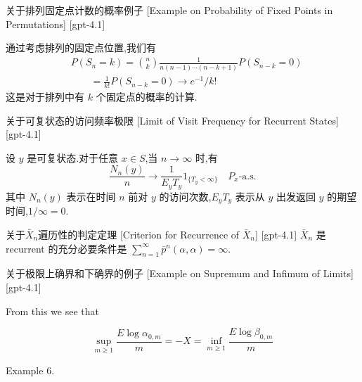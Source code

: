 \documentclass[UTF8]{ctexart}
\begin{document}
    
    
    \begin{xmp}
        {关于排列固定点计数的概率例子}
        [Example on Probability of Fixed Points in Permutations]
        [gpt-4.1]
        
通过考虑排列的固定点位置,我们有
\[
\begin{array}{rl}
& P(S_n = k) = \binom{n}{k} \frac{1}{n(n-1)\cdots(n-k+1)} P(S_{n-k} = 0) \\
& \qquad = \frac{1}{k!} P(S_{n-k} = 0) \to e^{-1}/k!
\end{array}
\]
这是对于排列中有 $k$ 个固定点的概率的计算.

    \end{xmp}
    
    
    
    \begin{thm}
        {关于可复状态的访问频率极限}
        [Limit of Visit Frequency for Recurrent States]
        [gpt-4.1]
        
设 $y$ 是可复状态.对于任意 $x \in S$,当 $n \to \infty$ 时,有
\[
\frac{N_n(y)}{n} \to \frac{1}{E_y T_y} 1_{\{T_y < \infty\}} \quad P_x\text{-a.s.}
\]
其中 $N_n(y)$ 表示在时间 $n$ 前对 $y$ 的访问次数,$E_y T_y$ 表示从 $y$ 出发返回 $y$ 的期望时间,$1/\infty = 0$.

    \end{thm}
    
    
    
    \begin{thm}
        {关于${ \bar { X } } _ { n }$遍历性的判定定理}
        [Criterion for Recurrence of ${ \bar { X } } _ { n }$]
        [gpt-4.1]
        ${ \bar { X } } _ { n }$ 是 recurrent 的充分必要条件是 $\sum _ { n = 1 } ^ { \infty } \bar { p } ^ { n } ( \alpha , \alpha ) = \infty$.
    \end{thm}
    
    
    
    \begin{xmp}
        {关于极限上确界和下确界的例子}
        [Example on Supremum and Infimum of Limits]
        [gpt-4.1]
        
From this we see that

\[
\sup_{m \geq 1} \frac{E \log \alpha_{0,m}}{m} = -X = \inf_{m \geq 1} \frac{E \log \beta_{0,m}}{m}
\]

Example 6.

    \end{xmp}
    
\end{document}
